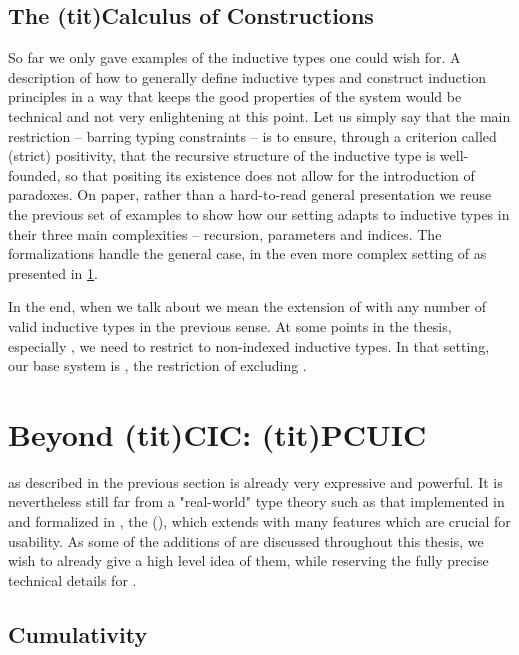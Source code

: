 \subsection{The \kl(tit){Calculus of Constructions}}

So far we only gave examples of the inductive types one could wish for.
A description of how to generally define inductive types and construct induction principles
in a way that keeps the good properties of the system would be technical and not
very enlightening at this point. Let us simply say that the main restriction – barring typing
constraints – is to ensure, through a criterion called (strict) positivity,
that the recursive structure of the inductive type
is well-founded, so that positing its existence does not allow for the
introduction of paradoxes.
On paper, rather than a hard-to-read general presentation we reuse the previous
set of examples to show how our setting adapts to inductive types in their
three main complexities – recursion, parameters and indices.
The formalizations handle the general case, in the even more complex setting of 
as presented in \cref{sec:tech-pcuic}.

In the end, when we talk about  we mean the extension of  with any number of
valid inductive types in the previous sense.
At some points in the thesis, especially , we need to restrict to
non-indexed inductive types. In that setting, our base system is ,
the restriction of  excluding .



\section{Beyond \kl(tit){CIC}: \kl(tit){PCUIC}}
\label{sec:tech-pcuic}

 as described in the previous section is already very expressive and powerful.
It is nevertheless
still far from a "real-world" type theory such as that implemented in  and
formalized in , the  (),
which extends  with many features which are crucial for usability. 
As some of the additions of  are discussed throughout this
thesis, we wish to already give a high level idea of them,
while reserving the fully precise technical details for .

\subsection{Cumulativity}

